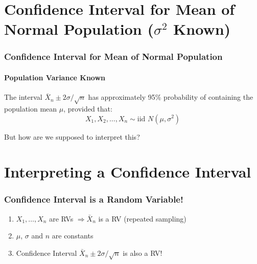 \section{Confidence Interval for Mean of Normal Population ($\sigma^2$ Known)}
\begin{frame}
\frametitle{Confidence Interval for Mean of Normal Population}
\framesubtitle{Population Variance Known}


	The interval \alert{$\boxed{\bar{X}_n \pm 2 \sigma/\sqrt{n}}$} has approximately 95\% probability of containing the population mean $\mu$, provided that:
		$$\boxed{X_1, X_2, \hdots, X_n\sim \mbox{iid } N(\mu,\sigma^2)}$$


\alert{But how are we supposed to interpret this?}

\end{frame}
\section{Interpreting a Confidence Interval}
%
%
%
\begin{frame}
\frametitle{Confidence Interval is a Random Variable!}
\begin{enumerate}
	\item $X_1, \hdots, X_n$ are RVs $\Rightarrow \bar{X}_n$ is a RV (repeated sampling) \pause
	\item $\mu$, $\sigma$ and $n$ are constants \pause
	\item Confidence Interval $\bar{X}_n \pm 2 \sigma/\sqrt{n}$ is also a RV!
\end{enumerate}


\end{frame}

